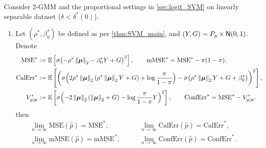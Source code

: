 \begin{prop}\label{prop:conf}
    Consider 2-GMM and the proportional settings in \cref{sec:logit_SVM} on linearly separable dataset ($\delta < \delta^*(0)$).
    \begin{enumerate}[label=(\alph*)]
        \item \label{prop:conf_asymp}
        Let $(\rho^*, \beta_0^*)$ be defined as per \cref{thm:SVM_main}, and $(Y, G) \sim P_y \times {\sf N}(0,1)$. Denote
        \begin{equation*}
            \begin{aligned}
                \mathrm{MSE}^*  
                & :=  \mathbb{E} \left[ \sigma \bigl( -\rho^* \left\|{\text{\boldmath $\mu$}}\right\|_2 - \beta_0^* Y + G \bigr)^2 \right],
                \qquad
                \mathrm{mMSE}^* = \mathrm{MSE}^* - \pi(1 - \pi),
                \\
                \mathrm{CalErr}^*
                & :=  \mathbb{E}\left[ \left( \sigma\Bigl( 2\rho^* \left\|{\text{\boldmath $\mu$}}\right\|_2 (\rho^* \left\|{\text{\boldmath $\mu$}}\right\|_2 Y + G) + \log\frac{\pi}{1-\pi} \Bigr) - \sigma\bigl( \rho^* \left\|{\text{\boldmath $\mu$}}\right\|_2 Y + G + \beta_0^* \bigr) \right)^2 \right], 
                \\
                V_{y|\text{\boldmath $x$}}^*
                & :=  \mathbb{E}\left[ \sigma\Bigl( -2\left\|{\text{\boldmath $\mu$}}\right\|_2( \left\|{\text{\boldmath $\mu$}}\right\|_2 + G ) - \log\frac{\pi}{1-\pi} Y \Bigr)^2 \right],
                \qquad
                \mathrm{ConfErr}^* = \mathrm{MSE}^* - V_{y|\text{\boldmath $x$}}^*.
            \end{aligned}
        \end{equation*}
        then
        \begin{equation*}
        \begin{aligned}
            \lim_{n \to \infty} \mathrm{MSE}(\hat p) = \mathrm{MSE}^*,
            \qquad
            & \lim_{n \to \infty} \mathrm{CalErr}(\hat p) = \mathrm{CalErr}^*, 
            \\
            \lim_{n \to \infty} \mathrm{mMSE}(\hat p) = \mathrm{mMSE}^*,
            \qquad
            & \lim_{n \to \infty} \mathrm{ConfErr}(\hat p) = \mathrm{ConfErr}^*.
        \end{aligned}
        \end{equation*}
        

\end{enumerate}
\end{prop}
